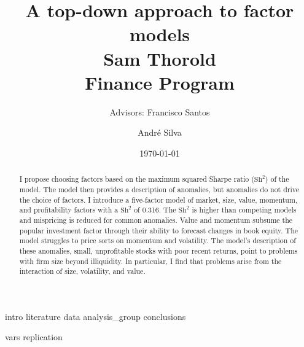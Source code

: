 \documentclass[a4paper, 12pt]{article}
\title{
  {A top-down approach to factor models}\\[1cm]
  {\Large Sam Thorold}\\%
  {\large Finance Program}\\
}
\author[1]{Advisors: Francisco Santos}
\affil[1]{Norwegian School of Economics}
\author[2]{Andr\'e Silva}
\affil[2]{NOVA School of Business and Economics}
\date{\today}
\begin{document}
\maketitle

\begin{abstract}
I propose choosing factors based on the maximum squared Sharpe ratio
($\text{Sh}^2$) of the model.
The model then provides a description of anomalies, but anomalies do not drive
the choice of factors.
I introduce a five-factor model of market, size, value, momentum, and
profitability factors with a $\text{Sh}^2$ of 0.316.
The $\text{Sh}^2$ is higher than competing models and mispricing is reduced
for common anomalies.
Value and momentum subsume the popular investment factor through their ability
to forecast changes in book equity.
The model struggles to price sorts on momentum and volatility.
The model's description of these anomalies, small, unprofitable stocks with
poor recent returns, point to problems with firm size beyond illiquidity.
In particular, I find that problems arise from the interaction of size,
volatility, and value.
\end{abstract}

\pagebreak


{intro}
{literature}
{data}
{analysis_group}
{conclusions}


\printbibliography

\appendix
{vars}
{replication}
\end{document}
